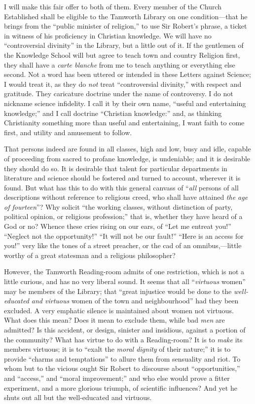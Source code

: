 I will make this fair offer to both of them. Every member of the
Church Established shall be eligible to the Tamworth Library on one
condition—that he brings from the ``public minister of
religion,'' to use Sir Robert's phrase, a ticket in witness of his
proficiency in Christian knowledge. We will have no
``controversial divinity'' in the Library, but a little out of
it. If the gentlemen of the Knowledge School will but agree to teach
town and country Religion first, they shall have a \emph{carte blanche}
from me to teach anything or everything else second. Not a word has
been uttered or intended in these Letters against Science; I would
treat it, as they do \emph{not} treat ``controversial
divinity,'' with respect and gratitude. They caricature doctrine
under the name of controversy. I do not nickname science infidelity. I
call it by their own name, ``useful and entertaining
knowledge;'' and I call doctrine ``Christian knowledge:''
and, as thinking Christianity something more than useful and
entertaining, I want faith to come first, and utility and amusement to
follow.

That persons indeed are found in all classes, high and low, busy
and idle, capable of proceeding from sacred to profane knowledge, is
undeniable; and it is desirable they should do so. It is desirable
that talent for particular departments in literature and science
should be fostered and turned to account, wherever it is found. But
what has this to do with this general canvass of ``\emph{all}
persons of all descriptions without reference to religious creed, who
shall have attained \emph{the age of fourteen}''? Why solicit
``the working classes, without distinction of party, political
opinion, or religious profession;'' that is, whether they have
heard of a God or no? Whence these cries rising on our ears, of
``Let me entreat you!'' ``Neglect not the
opportunity!'' ``It will not be our fault!'' ``Here is
an access for you!'' very like the tones of a street preacher, or
the cad of an omnibus,—little worthy of a great statesman and a
religious philosopher?

However, the Tamworth Reading-room admits of one restriction, which
is not a little curious, and has no very liberal sound. It seems that
all ``\emph{virtuous} women'' may be members of the Library;
that ``great injustice would be done to the \emph{well-educated and
virtuous} women of the town and neighbourhood'' had they been
excluded. A very emphatic silence is maintained about women not
virtuous. What does this mean? Does it mean to exclude them, while bad
\emph{men} are admitted? Is this accident, or design, sinister and
insidious, against a portion of the community? What has virtue to do
with a Reading-room? It is to \emph{make} its members virtuous; it is
to ``exalt the \emph{moral dignity} of their nature;'' it is
to provide ``charms and temptations'' to allure them from sensuality and riot. To whom but to the vicious ought Sir Robert
to discourse about ``opportunities,'' and ``access,''
and ``moral improvement;'' and who else would prove a fitter
experiment, and a more glorious triumph, of scientific influences? And
yet he shuts out all but the well-educated and virtuous.

